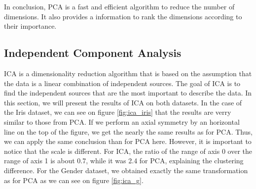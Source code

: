 \documentclass[twocolumn, 10pt]{article}
\begin{document}
			In conclusion, PCA is a fast and efficient algorithm to reduce the number of dimensions. It also provides a information to rank the dimensions according to their importance.
		\subsection{Independent Component Analysis}
			ICA is a dimensionality reduction algorithm that is based on the assumption that the data is a linear combination of independent sources. The goal of ICA is to find the independent sources that are the most important to describe the data. In this section, we will present the results of ICA on both datasets. In the case of the Iris dataset, we can see on figure \ref{fig:ica_iris} that the results are verry similar to those from PCA. If we perform an axial symmetry by an horizontal line on the top of the figure, we get the nearly the same results as for PCA. Thus, we can apply the same conclusion than for PCA here. However, it is important to notice that the scale is different. For ICA, the ratio of the range of axis 0 over the range of axis 1 is about 0.7, while it was 2.4 for PCA, explaining the clustering difference. For the Gender dataset, we obtained exactly the same transformation as for PCA as we can see on figure \ref{fig:ica_g}.
\end{document}
